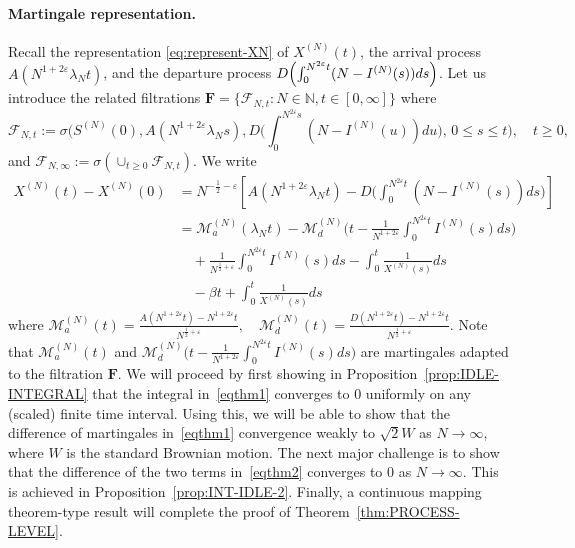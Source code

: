 \documentclass[11pt, reqno]{article}
\DeclarePairedDelimiter\autobracket{(}{)}
\newcommand{\br}[1]{\autobracket*{#1}}
\numberwithin{equation}{section}
\numberwithin{theorem}{section}
\newcommand\blue[1]{#1}
\begin{document}
\paragraph{Martingale representation.}
Recall the representation \eqref{eq:represent-XN} of $X^{(N)}(t)$, the arrival process $A(N^{1+2\varepsilon}\lambda_Nt)$, and the departure process  $D\br{\int_0^{N^{2\varepsilon}t}(N-I^{(N)}(s))ds}$.
Let us introduce the related filtrations $\mathbf{F}=\big\{\mathcal{F}_{N,t}: N\in\mathbb{N}, t \in [0, \infty]\big\}$ where
\begin{equation}\label{eq:filtration}
    \mathcal{F}_{N,t}:=\sigma\Big(S^{(N)}(0), A(N^{1+2\varepsilon}\lambda_N s), D\Big(\int_0^{N^{2\varepsilon}s}(N-I^{(N)}(u))du\Big), \, 0\leq s\leq t\Big),\quad t\geq 0,
\end{equation}
and $\mathcal{F}_{N,\infty}:=\sigma(\cup_{t\geq 0}\mathcal{F}_{N,t})$.
We write
\begin{align}
    X^{(N)}(t)-X^{(N)}(0)&= N^{-\frac{1}{2}-\varepsilon}\left[A(N^{1+2\varepsilon}\lambda_Nt) - D\Big(\int_0^{N^{2\varepsilon}t}(N-I^{(N)}(s))ds\Big)\right]\nonumber\\
    &=\mathcal{M}_a^{(N)}(\lambda_N t)-\mathcal{M}_d^{(N)}\Big(t-\frac{1}{N^{1+2\varepsilon}} \int_0^{N^{2\varepsilon}t} I^{(N)}(s)ds\Big) \label{eqthm1}\\
    &\quad+\frac{1}{N^{\frac{1}{2}+\varepsilon}} \int_0^{N^{2\varepsilon}t} I^{(N)}(s)ds-\int_0^t\frac{1}{X^{(N)}(s)}ds\label{eqthm2}\\ 
    &\quad-\beta t+\int_0^t\frac{1}{X^{(N)}(s)}ds\label{eqthm3}
\end{align}
where 
$\mathcal{M}_a^{(N)}(t)=\frac{A(N^{1+2\varepsilon}t)-N^{1+2\varepsilon}t}{N^{\frac{1}{2}+\varepsilon}},\quad \mathcal{M}_d^{(N)}(t)=\frac{D(N^{1+2\varepsilon}t)-N^{1+2\varepsilon}t}{N^{\frac{1}{2}+\varepsilon}}.$
Note that $\mathcal{M}_a^{(N)}(t)$ and \blue{$\mathcal{M}_d^{(N)}\Big(t-\frac{1}{N^{1+2\varepsilon}} \int_0^{N^{2\varepsilon}t} I^{(N)}(s)ds\Big)$} are martingales adapted to the filtration $\mathbf{F}$.
We will proceed by first showing in Proposition~\ref{prop:IDLE-INTEGRAL} that the 
integral in~\eqref{eqthm1} converges to 0 uniformly on any (scaled) finite time interval.
Using this, we will be able to show that the difference of martingales in~\eqref{eqthm1} convergence weakly to $\sqrt{2}W$ as $N\to\infty$, where $W$ is the standard Brownian motion.
The next major challenge is to show that 
the difference of the two terms in~\eqref{eqthm2} converges to 0 as $N\to\infty$.
This is achieved in Proposition~\ref{prop:INT-IDLE-2}.
Finally, a continuous mapping theorem-type result will complete the proof of Theorem~\ref{thm:PROCESS-LEVEL}.
\end{document}
